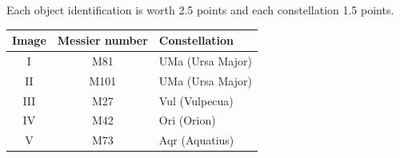 Each object identification is worth 2.5 points and each constellation 1.5
points.

\begin{center}
\begin{tabular}{ccl}
Image & Messier number & Constellation \\
\hline
I & M81 & UMa (Ursa Major) \\
II & M101 & UMa (Ursa Major) \\
III & M27 & Vul (Vulpecua) \\ %
IV & M42 & Ori (Orion) \\
V & M73 & Aqr (Aquatius) \\ %
\end{tabular}
\end{center}
